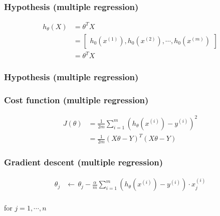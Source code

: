 \begin{frame}
  \frametitle{Hypothesis (multiple regression)}

  \begin{bphrase}
    \begin{align*}
      h_\theta(X) & = \theta^T X \\[2mm]
      & =
        \begin{bmatrix}
          h_0(x^{(1)}), h_0(x^{(2)}), \cdots, h_0(x^{(m)})
        \end{bmatrix} \\
                  & = \theta^T X
    \end{align*}
  \end{bphrase}
\end{frame}

\begin{frame}
  \frametitle{Hypothesis (multiple regression)}

\end{frame}

\begin{frame}
  \frametitle{Cost function (multiple regression)}

  \begin{bphrase}
    \begin{align*}
      J(\theta) & = \frac{1}{2m} \sum_{i=1}^m
                  \left(h_{\theta}(x^{(i)}) - y^{(i)}\right)^2 \\
      &= \frac{1}{2m} (X\theta - Y)^T (X\theta - Y)
    \end{align*}
  \end{bphrase}
\end{frame}

\begin{frame}
  \frametitle{Gradient descent (multiple regression)}

  \begin{bphrase}
    \begin{align*}
      \theta_j & \leftarrow\, \theta_j - \frac{\alpha}{m} \sum_{i=1}^m
                 \left(h_{\theta}(x^{(i)}) - y^{(i)}\right) \cdot x_j^{(i)} \\
    \end{align*}
    \centerline{for $j=1, \cdots, n$}
  \end{bphrase}
\end{frame}

